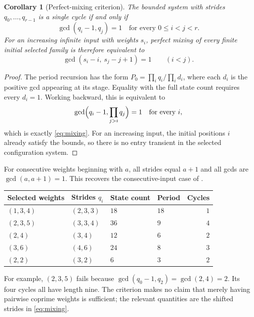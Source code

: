 \documentclass[11pt,letterpaper]{article}
\newtheorem{corollary}[theorem]{Corollary}
\theoremstyle{definition}
\begin{document}
\begin{corollary}[Perfect-mixing criterion]\label{cor:mixing}
The bounded system with strides $q_0,\ldots,q_{r-1}$ is a single cycle if
and only if
\begin{equation}\label{eq:mixing}
 \boxed{\quad\gcd(q_i-1,q_j)=1
                  \quad\text{for every }0\le i<j<r.\quad}
\end{equation}
For an increasing infinite input with weights $s_i$, perfect mixing of every
finite initial selected family is therefore equivalent to
\[
 \gcd(s_i-i,\ s_j-j+1)=1\qquad(i<j).
\]
\end{corollary}
\begin{proof}
The period recursion has the form $P_0=\prod_iq_i/\prod_id_i$, where each
$d_i$ is the positive gcd appearing at its stage. Equality with the full
state count requires every $d_i=1$. Working backward, this is equivalent to
\[
 \gcd\Bigl(q_i-1,\prod_{j>i}q_j\Bigr)=1
 \quad\text{for every }i,
\]
which is exactly \eqref{eq:mixing}. For an increasing input, the initial
positions $i$ already satisfy the bounds, so there is no entry transient in
the selected configuration system.
\end{proof}
For consecutive weights beginning with $a$, all strides equal $a+1$ and
all gcds are $\gcd(a,a+1)=1$. This recovers the consecutive-input case of
\cite[Theorem~9]{DD}.

\begin{center}
\begin{tabular}{@{}llllr@{}}
\toprule
Selected weights & Strides $q_i$ & State count & Period & Cycles\\
\midrule
$(1,3,4)$ & $(2,3,3)$ & $18$ & $18$ & $1$\\
$(2,3,5)$ & $(3,3,4)$ & $36$ & $9$ & $4$\\
$(2,4)$ & $(3,4)$ & $12$ & $6$ & $2$\\
$(3,6)$ & $(4,6)$ & $24$ & $8$ & $3$\\
$(2,2)$ & $(3,2)$ & $6$ & $3$ & $2$\\
\bottomrule
\end{tabular}
\end{center}
For example, $(2,3,5)$ fails because
$\gcd(q_0-1,q_2)=\gcd(2,4)=2$. Its four cycles all have length nine.
The criterion makes no claim that merely having pairwise coprime weights is
sufficient; the relevant quantities are the shifted strides in
\eqref{eq:mixing}.
\end{document}
